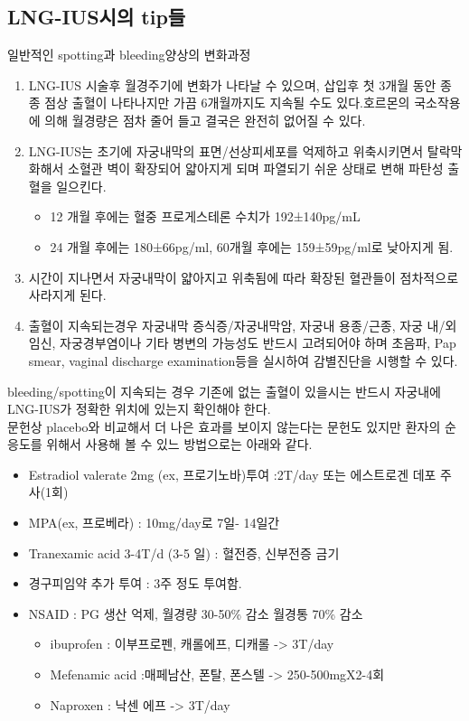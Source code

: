 \subsection{LNG-IUS시의 tip들}
일반적인 spotting과 bleeding양상의 변화과정
\begin{enumerate}\tightlist
\item LNG-IUS 시술후 월경주기에 변화가 나타날 수 있으며, 삽입후 첫 3개월 동안 종종 점상 출혈이 나타나지만 가끔 6개월까지도 지속될 수도 있다.호르몬의 국소작용에 의해 월경량은 점차 줄어 들고 결국은 완전히 없어질 수 있다.
\item LNG-IUS는 초기에 자궁내막의 표면/선상피세포를 억제하고 위축시키면서 탈락막화해서 소혈관 벽이 확장되어 얇아지게 되며 파열되기 쉬운 상태로 변해 파탄성 출혈을 일으킨다.
	\begin{itemize}\tightlist
	\item 12 개월 후에는 혈중 프로게스테론 수치가 192±140pg/mL
	\item 24 개월 후에는 180±66pg/ml, 60개월 후에는 159±59pg/ml로 낮아지게 됨.
	\end{itemize}
\item 시간이 지나면서 자궁내막이 얇아지고 위축됨에 따라 확장된 혈관들이 점차적으로 사라지게 된다.
\item 출혈이 지속되는경우 자궁내막 증식증/자궁내막암, 자궁내 용종/근종, 자궁 내/외 임신, 자궁경부염이나 기타 병변의 가능성도 반드시 고려되어야 하며 초음파, Pap smear, vaginal discharge examination등을 실시하여 감별진단을 시행할 수 있다.	
\end{enumerate}

\begin{commentbox}{bleeding/spotting이 지속되는 경우}
기존에 없는 출혈이 있을시는 반드시 자궁내에 LNG-IUS가 정확한 위치에 있는지 확인해야 한다.\\
문헌상 placebo와 비교해서 더 나은 효과를 보이지 않는다는 문헌도 있지만 환자의 순응도를 위해서 사용해 볼 수 있느 방법으로는 아래와 같다.
\begin{itemize}\tightlist
\item Estradiol valerate 2mg (ex, 프로기노바)투여 :2T/day 또는 에스트로겐 데포 주사(1회)
\item MPA(ex, 프로베라) : 10mg/day로 7일- 14일간
\item Tranexamic acid 3-4T/d (3-5 일) : 혈전증, 신부전증 금기
\item 경구피임약 추가 투여 : 3주 정도 투여함.
\item NSAID : PG 생산 억제, 월경량 30-50\% 감소 월경통 70\% 감소
	\begin{itemize}\tightlist
	\item ibuprofen : 이부프로펜, 캐롤에프, 디캐롤 -> 3T/day
	\item Mefenamic acid :매페남산, 폰탈, 폰스텔 -> 250-500mgX2-4회
	\item Naproxen :  낙센 에프 -> 3T/day
	\end{itemize}
\end{itemize}
\end{commentbox}
